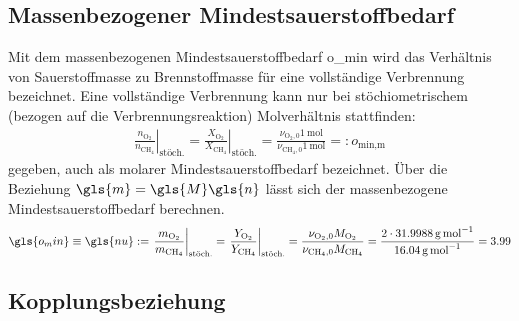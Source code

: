\subsection{Massenbezogener Mindestsauerstoffbedarf}

Mit dem massenbezogenen Mindestsauerstoffbedarf \gls{o_min} wird das Verhältnis von Sauerstoffmasse zu Brennstoffmasse für eine vollständige Verbrennung bezeichnet. Eine vollständige Verbrennung kann nur bei stöchiometrischem (bezogen auf die Verbrennungsreaktion) Molverhältnis stattfinden:
\begin{align}
      \left. \frac{ n_{\mathrm{O}_2} }{ n_{\mathrm{CH}_4} } \right|_{\text{stöch.}}
    = \left. \frac{ X_{\mathrm{O}_2} }{ X_{\mathrm{CH}_4} } \right|_{\text{stöch.}}
    = \frac{ \nu_{\mathrm{O}_2,0} \SI{1}{\mole} }{ \nu_{\mathrm{CH}_4,0} \SI{1}{\mole} }
    =: o_{\text{min,m}}
\end{align}
gegeben, auch als molarer Mindestsauerstoffbedarf bezeichnet.
Über die Beziehung $\gls{m} = \gls{M} \gls{n}$ lässt sich der massenbezogene Mindestsauerstoffbedarf berechnen.
\begin{align}
    \label{eq:omin}
    \gls{o_min} \equiv \gls{nu} :=
      \left. \frac{ m_{\mathrm{O}_2} }{ m_{\mathrm{CH}_4} } \right|_{\text{stöch.}}
    = \left. \frac{ Y_{\mathrm{O}_2} }{ Y_{\mathrm{CH}_4} } \right|_{\text{stöch.}}
    = \frac{ \nu_{\mathrm{O}_2,0} M_{\mathrm{O}_2} }{ \nu_{\mathrm{CH}_4,0} M_{\mathrm{CH}_4} }
    = \frac{ 2\cdot\SI{31.9988}{\gram\per\mole} }{ \SI{16.04}{\gram\per\mole} }
    = 3.99
\end{align}


\subsection{Kopplungsbeziehung}

